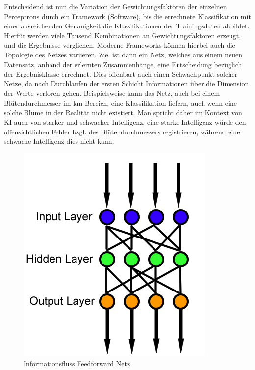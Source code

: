 \newline Entscheidend ist nun die Variation der Gewichtungsfaktoren der einzelnen Perceptrons durch ein Framework (Software), bis die errechnete Klassifikation mit einer ausreichenden Genauigkeit die Klassifikationen der Trainingsdaten abbildet. Hierfür werden viele Tausend Kombinationen an Gewichtungsfaktoren erzeugt, und die Ergebnisse verglichen. Moderne Frameworks können hierbei auch die Topologie des Netzes variieren. Ziel ist dann ein Netz, welches aus einem neuen Datensatz, anhand der erlernten Zusammenhänge, eine Entscheidung bezüglich der Ergebnisklasse errechnet. Dies offenbart auch einen Schwachpunkt solcher Netze, da nach Durchlaufen der ersten Schicht Informationen über die Dimension der Werte verloren gehen. Beispielsweise kann das Netz, auch bei einem Blütendurchmesser im km-Bereich, eine Klassifikation liefern, auch wenn eine solche Blume in der Realität nicht existiert. Man spricht daher im Kontext von KI auch von starker und schwacher Intelligenz, eine starke Intelligenz würde den offensichtlichen Fehler bzgl. des Blütendurchmessers registrieren, während eine schwache Intelligenz dies nicht kann.
\begin{figure}[H]
    \begin{center}
        \includegraphics[width=0.7\linewidth]{images/feedforward.png}
        \caption[Feedforward Netz]{Informationsfluss Feedforward Netz \cite{feedforward}}
        \label{fi:feedforward}
    \end{center}
\end{figure}
